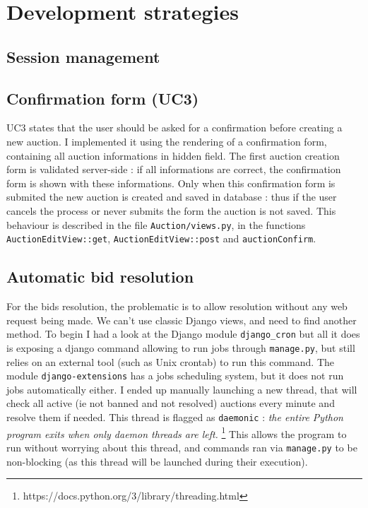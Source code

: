 \documentclass[a4paper, 11pt]{report}
\begin{document}
\chapter{Development strategies}

    \section{Session management}

    \section{Confirmation form (UC3)}

    UC3 states that the user should be asked for a confirmation before creating a new auction. I implemented it using the rendering of a confirmation form, containing all auction informations in hidden field. The first auction creation form is validated server-side : if all informations are correct, the confirmation form is shown with these informations. Only when this confirmation form is submited the new auction is created and saved in database : thus if the user cancels the process or never submits the form the auction is not saved. This behaviour is described in the file \texttt{Auction/views.py}, in the functions \texttt{AuctionEditView::get}, \texttt{AuctionEditView::post} and \texttt{auctionConfirm}. 

    \section{Automatic bid resolution}

    For the bids resolution, the problematic is to allow resolution without any web request being made. We can't use classic Django views, and need to find another method. To begin I had a look at the Django module \texttt{django\_cron} but all it does is exposing a django command allowing to run jobs through \texttt{manage.py}, but still relies on an external tool (such as Unix crontab) to run this command. The module \texttt{django-extensions} has a jobs scheduling system, but it does not run jobs automatically either. I ended up manually launching a new thread, that will check all active (ie not banned and not resolved) auctions every minute and resolve them if needed. This thread is flagged as \texttt{daemonic} : \textit{the entire Python program exits when only daemon threads are left. }\footnote{https://docs.python.org/3/library/threading.html} This allows the program to run without worrying about this thread, and commands ran via \texttt{manage.py} to be non-blocking (as this thread will be launched during their execution). 
\end{document}
